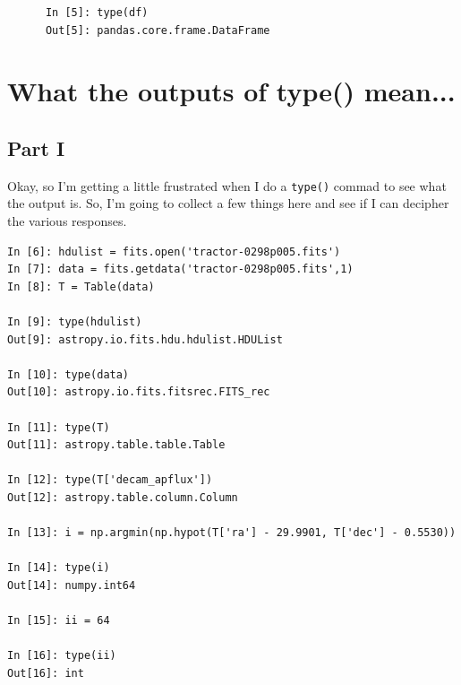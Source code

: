\documentclass[11pt,a4paper]{article}
\begin{document}
    \begin{lstlisting}
      In [5]: type(df)
      Out[5]: pandas.core.frame.DataFrame
    \end{lstlisting}



\newpage
\section{What the outputs of type() mean...}
\subsection{Part I}
Okay, so I'm getting a little frustrated when I do a {\tt type()} commad to see what the output is. 
So, I'm going to collect a few things here and see if I can decipher the various responses. 

\begin{lstlisting}
In [6]: hdulist = fits.open('tractor-0298p005.fits')
In [7]: data = fits.getdata('tractor-0298p005.fits',1)
In [8]: T = Table(data)

In [9]: type(hdulist)
Out[9]: astropy.io.fits.hdu.hdulist.HDUList

In [10]: type(data)
Out[10]: astropy.io.fits.fitsrec.FITS_rec

In [11]: type(T)
Out[11]: astropy.table.table.Table

In [12]: type(T['decam_apflux'])
Out[12]: astropy.table.column.Column

In [13]: i = np.argmin(np.hypot(T['ra'] - 29.9901, T['dec'] - 0.5530))

In [14]: type(i)
Out[14]: numpy.int64

In [15]: ii = 64

In [16]: type(ii)
Out[16]: int
\end{lstlisting}
    
\end{document}
